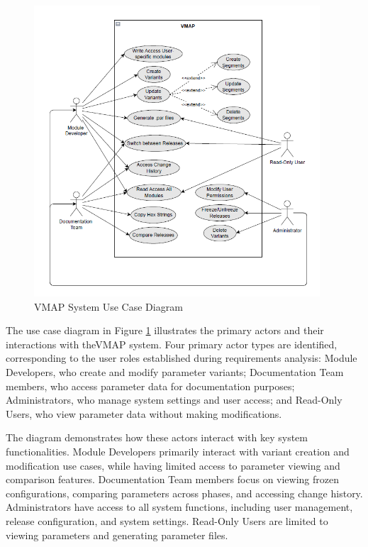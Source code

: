 \begin{figure}[h]
    \centering
    \includegraphics[width=0.95\textwidth]{figures/vmap_use_case_diagram.png}
    \caption{VMAP System Use Case Diagram}
    \label{fig:use-case-diagram}
\end{figure}

The use case diagram in Figure \ref{fig:use-case-diagram} illustrates the primary actors and their interactions with the\ac{VMAP} system. Four primary actor types are identified, corresponding to the user roles established during requirements analysis: Module Developers, who create and modify parameter variants; Documentation Team members, who access parameter data for documentation purposes; Administrators, who manage system settings and user access; and Read-Only Users, who view parameter data without making modifications.

The diagram demonstrates how these actors interact with key system functionalities. Module Developers primarily interact with variant creation and modification use cases, while having limited access to parameter viewing and comparison features. Documentation Team members focus on viewing frozen configurations, comparing parameters across phases, and accessing change history. Administrators have access to all system functions, including user management, release configuration, and system settings. Read-Only Users are limited to viewing parameters and generating parameter files.

